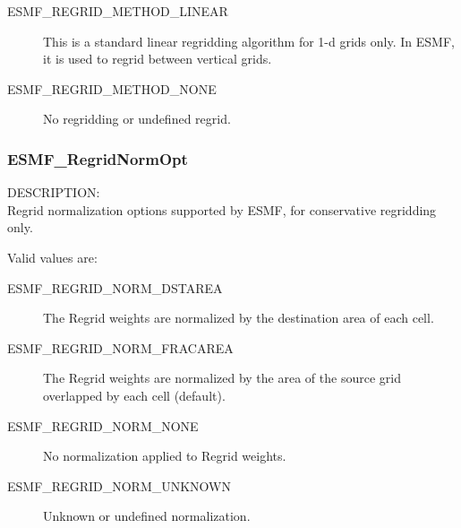 \begin{description}
\item[ESMF\_REGRID\_METHOD\_LINEAR  ]
     This is a standard linear regridding algorithm for 1-d grids only.  In ESMF,
     it is used to regrid between vertical grids.

\item [ESMF\_REGRID\_METHOD\_NONE]
     No regridding or undefined regrid.
\end{description}



\subsubsection{ESMF\_RegridNormOpt}

{\sf DESCRIPTION:\\}
Regrid normalization options supported by ESMF, for conservative regridding only.

Valid values are:
\begin{description}
   \item [ESMF\_REGRID\_NORM\_DSTAREA]
         The Regrid weights are normalized by the destination area of each cell. 
   \item [ESMF\_REGRID\_NORM\_FRACAREA]
         The Regrid weights are normalized by the area of the source grid
         overlapped by each cell (default).
   \item [ESMF\_REGRID\_NORM\_NONE]
         No normalization applied to Regrid weights.
   \item [ESMF\_REGRID\_NORM\_UNKNOWN]
         Unknown or undefined normalization.
\end{description}
